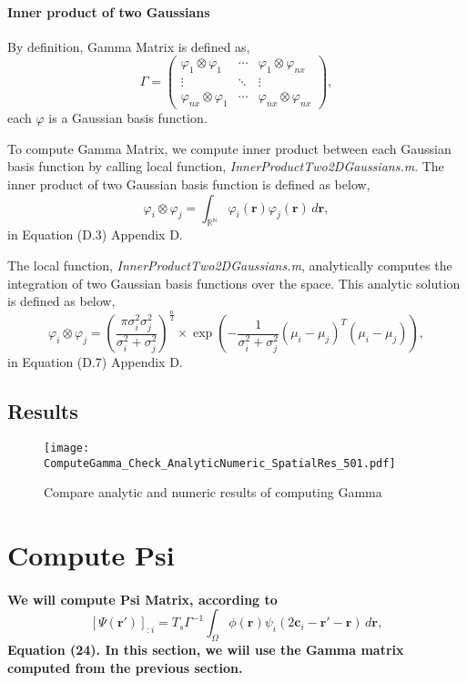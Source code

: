\documentclass[a4paper, 12pt, english]{article}
\begin{document}
\paragraph{Inner product of two Gaussians\newline}
By definition, Gamma Matrix is defined as,
$$\Gamma = \left(
\begin{array}{ccc}
\varphi_1\otimes\varphi_1&\cdots&\varphi_1\otimes\varphi_{nx}\\
\vdots&\ddots&\vdots\\
\varphi_{nx}\otimes\varphi_1&\cdots&\varphi_{nx}\otimes\varphi_{nx}
\end{array}
\right),$$ each $ \varphi$ is a Gaussian basis function.\par
To compute Gamma Matrix, we compute inner product between each Gaussian basis
function by calling local function, \textit{InnerProductTwo2DGaussians.m}. \newline The inner
product of two Gaussian basis function is defined as below,
$$\varphi_i\otimes\varphi_j=\int_{\mathbb{R}^\mathbb{N}}\varphi_i(\boldsymbol{r})\varphi_j(\boldsymbol{r})\,d\boldsymbol{r},$$
in Equation (D.3) Appendix D.\par
The local function, \textit{InnerProductTwo2DGaussians.m}, analytically computes the
integration of two Gaussian basis functions over the space. This analytic solution
is defined as below,
$$\varphi_i\otimes\varphi_j = \left(\frac{\pi\sigma^2_i\sigma^2_j}{\sigma^2_i+\sigma^2_j}\right)^{\frac{n}{2}}
\times\exp{\left(-\frac{1}{\sigma^2_i+\sigma^2_j}(\mu_i-\mu_j)^T(\mu_i-\mu_j)\right)}, $$
in Equation (D.7) Appendix D.
\subsection{Results}
\begin{figure}[H]
\centering
\texttt{[image: ComputeGamma\_Check\_AnalyticNumeric\_SpatialRes\_501.pdf]}
\caption{Compare analytic and numeric results of computing Gamma}
\end{figure}

\newpage



\section{Compute Psi}
\paragraph{We will compute Psi Matrix, according to
$$[\Psi(\boldsymbol{r}\prime)]_{:i}= T_s\Gamma^{-1}\int_{\Omega}\phi(\boldsymbol{r})\psi_i(2\boldsymbol{c}_i-\boldsymbol{r}\prime- \boldsymbol{r})\,d\boldsymbol{r},$$
Equation (24). In this section, we
wiil use the Gamma matrix computed from the previous section.}
\end{document}
